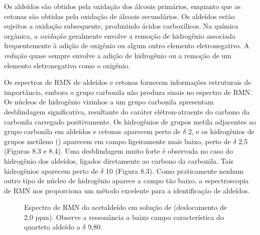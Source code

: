 \begin{tightcenter}
    \qquad
    \qquad
    \qquad
\end{tightcenter}


Os aldeídos são obtidos pela oxidação dos álcoois primários, enquanto que as cetonas são obtidas pela oxidação de álcoois secundários. Os aldeídos estão sujeitos a oxidação subsequente, produzindo ácidos carboxílicos. Na química orgânica, a \textit{oxidação} geralmente envolve a remoção de hidrogênio associada frequentemente à adição de oxigênio ou algum outro elemento eletronegativo. A \textit{redução} quase sempre envolve a adição de hidrogênio ou a remoção de um elemento eletronegativo como o oxigênio. 


Os espectros de RMN de aldeídos e cetonas fornecem informações estruturais de importância, embora o grupo carbonila não produza sinais no espectro de RMN. Os núcleos de hidrogênio vizinhos a um grupo carbonila apresentam desblindagem significativa, resultante do caráter elétron-atraente do carbono da carbonila carregado positivamente. Os hidrogênios de grupos metila adjacentes ao grupo carbonila em aldeídos e cetonas aparecem perto de $\delta$ 2, e os hidrogênios de grupos metileno () aparecem em campo ligeiramente mais baixo, perto de $\delta$ 2,5 (Figuras 8.3 e 8.4). Uma desblindagem muito forte é observada no caso do hidrogênio dos aldeídos, ligados diretamente ao carbono da carbonila. Tais hidrogênios aparecem perto de $\delta$ 10 (Figura 8.3). Como praticamente nenhum outro tipo de núcleo de hidrogênio aparece a campo tão baixo, a espectroscopia de RMN nos proporciona um método excelente para a identificação de aldeídos.

\begin{figure}[H]
    \centering
    \caption{Espectro de RMN do acetaldeído em solução de  (deslocamento de 2,0 ppm). Observe a ressonância a baixo campo característica do quarteto aldeído a $\delta$ 9,80.}
    \label{fig8_3}
\end{figure}

